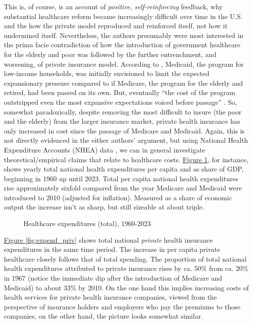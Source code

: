 \documentclass[11pt]{article}
\begin{document}
This is, of course, is an account of \textit{positive, self-reinforcing} feedback, why substantial healthcare reform became increasingly difficult over time in the U.S. and the how the private model reproduced and reinforced itself, not how it undermined itself. Nevertheless, the authors presumably were most interested in the prima facie contradiction of how the introduction of government healthcare for the elderly and poor was followed by the further entrenchment, and worsening, of private insurance model. According to \textcite[][]{Hacker1998}, Medicaid, the program for low-income households, was initially envisioned to limit the expected expansionary pressure compared to if Medicare, the program for the elderly and retired, had been passed on its own. But, eventually \enquote{the cost of the program outstripped even the most expansive expectations voiced before passage} . So, somewhat paradoxically, despite removing the most difficult to insure (the poor and the elderly) from the larger insurance market, private health insurance has only increased in cost since the passage of Medicare and Medicaid. Again, this is not directly evidenced in the either authors' argument, but using National Health Expenditure Accounts (NHEA) data \parencite[][]{NHEA}, we can in general investigate theoretical/empirical claims that relate to healthcare costs. \hyperref[fig:expend_total]{Figure \ref*{fig:expend_total}}, for instance, shows yearly total national health expenditures per capita and as share of GDP, beginning in 1960 up until 2023. Total per capita national health expenditures rise approximately sixfold compared from the year Medicare and Medicaid were introduced to 2010 (adjusted for inflation). Measured as a share of economic output the increase isn't as sharp, but still sizeable at about triple.

\begin{figure}[!h]
  \sffamily
  \caption{Healthcare expenditures (total), 1960-2023}
  
  \label{fig:expend_total}
\end{figure}

\hyperref[fig:expend_priv]{Figure \ref*{fig:expend_priv}} shows total national \textit{private} health insurance expenditures in the same time period. The increase in per capita private healthcare closely follows that of total spending. The proportion of total national health expenditures attributed to private insurance rises by ca. 50\% from ca. 20\% in 1967 (notice the immediate dip after the introduction of Medicare and Medicaid) to about 33\% by 2010. On the one hand this implies increasing costs of health services for private health insurance companies, viewed from the perspective of insurance holders and employers who pay the premiums to those companies, on the other hand, the picture looks somewhat similar.
\end{document}
